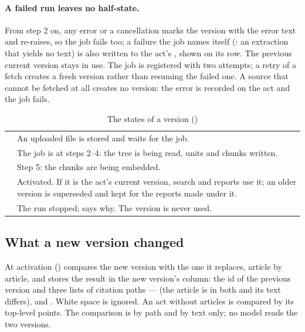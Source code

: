 \paragraph{A failed run leaves no half-state.} From step 2 on, any error or a cancellation
marks the version  with the error text and re-raises, so the job fails too; a
failure the job names itself (: an extraction that yields no text) is also written
to the act's , shown on its row. The previous current version stays in use.
The job is registered with two attempts; a retry of a fetch creates a fresh version rather
than resuming the failed one. A source that cannot be fetched at all creates no version: the
error is recorded on the act and the job fails.

\begin{table}[H]
\caption{The states of a version ()}\label{tab:corpus:status}
\begin{tabularx}{\textwidth}{@{}L{22mm}Y@{}}
\toprule
{} &  \\
\midrule
{} & An uploaded file is stored and waits for the job. \\
 & The job is at steps 2–4: the tree is being read, units and chunks written. \\
 & Step 5: the chunks are being embedded. \\
 & Activated. If it is the act's current version, search and reports use it; an older  version is superseded and kept for the reports made under it. \\
 & The run stopped;  says why. The version is never used. \\
\bottomrule
\end{tabularx}
\end{table}

\subsection{What a new version changed}\label{sec:corpus:changes}

At activation  () compares the new version with
the one it replaces, article by article, and stores the result in the new version's
 column: the id of the previous version and three lists of citation paths ---
 (the article is in both and its text differs),  and
. White space is ignored. An act without articles is compared by its top-level
points. The comparison is by path and by text only; no model reads the two versions.

